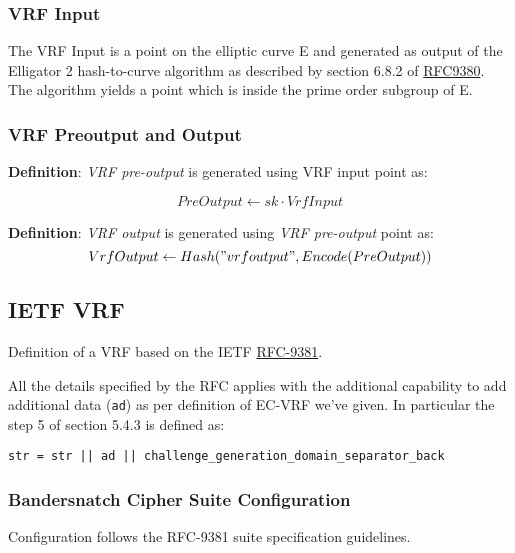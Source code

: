\documentclass[
]{article}
\begin{document}
\hypertarget{vrf-input}{%
\subsubsection{VRF Input}\label{vrf-input}}

The VRF Input is a point on the elliptic curve E and generated as output
of the Elligator 2 hash-to-curve algorithm as described by section 6.8.2
of \href{https://datatracker.ietf.org/doc/rfc9380/}{RFC9380}. The
algorithm yields a point which is inside the prime order subgroup of E.

\hypertarget{vrf-preoutput-and-output}{%
\subsubsection{VRF Preoutput and
Output}\label{vrf-preoutput-and-output}}

\textbf{Definition}: \emph{VRF pre-output} is generated using VRF input
point as:

\[ PreOutput \leftarrow sk \cdot VrfInput \]

\textbf{Definition}: \emph{VRF output} is generated using \emph{VRF
pre-output} point as:
\[ VrfOutput \leftarrow Hash("vrfoutput", Encode(PreOutput)) \]

\hypertarget{ietf-vrf}{%
\subsection{IETF VRF}\label{ietf-vrf}}

Definition of a VRF based on the IETF
\href{https://www.rfc-editor.org/rfc/rfc9381}{RFC-9381}.

All the details specified by the RFC applies with the additional
capability to add additional data (\texttt{ad}) as per definition of
EC-VRF we've given. In particular the step 5 of section 5.4.3 is defined
as:

\begin{verbatim}
str = str || ad || challenge_generation_domain_separator_back
\end{verbatim}

\hypertarget{bandersnatch-cipher-suite-configuration}{%
\subsubsection{Bandersnatch Cipher Suite
Configuration}\label{bandersnatch-cipher-suite-configuration}}

Configuration follows the RFC-9381 suite specification guidelines.
\end{document}
